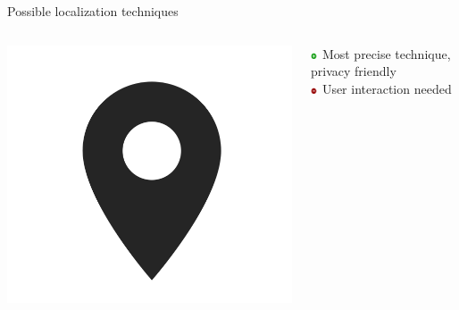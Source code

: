 \documentclass[11pt]{beamer}
\begin{document}
\begin{frame}{Possible localization techniques}
\begin{columns}[c]
    \begin{column}{0.2\textwidth}
      \includegraphics[width=\textwidth]{location-symbol}
    \end{column}

    \hfill

    \begin{column}{0.8\textwidth}

      \includegraphics[width=0.05\textwidth]{plus} Most precise technique, privacy friendly\\
      \includegraphics[width=0.05\textwidth]{minus} User interaction needed

    \end{column}

  \end{columns}

\end{frame}
\end{document}
